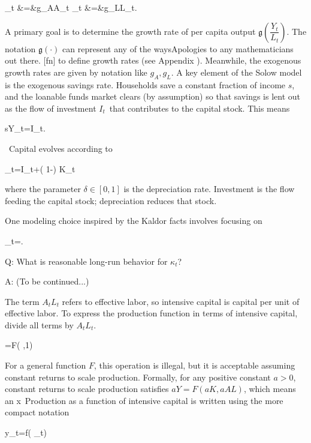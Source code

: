 ﻿\documentclass[oneside]{book}
\begin{document}
_{t} &=&g_{A}A_{t}
_{t} &=&g_{L}L_{t}.


A primary goal is to determine the growth rate of per capita output $\mathfrak{g}( \dfrac{Y_{t}}{L_{t}}) $. The notation $\mathfrak{g}( \cdot ) $ can represent any of the waysApologies to any mathematicians out there. [fn] to define growth
rates (see Appendix ). Meanwhile, the exogenous growth rates are given by notation like $g_{A},g_{L}$.
A key element of the Solow model is the exogenous savings rate. Households
save a constant fraction of income $s$, and the loanable funds market clears
(by assumption) so that savings is lent out as the flow of investment $I_{t}$\ that contributes to the capital stock. This means



sY_{t}=I_{t}.



\ Capital evolves according to



_{t}=I_{t}+( 1-\delta ) K_{t}\text{,}


where the parameter $\delta \in [ 0,1] $ is the depreciation rate.  Investment is the flow feeding the capital stock; depreciation reduces that stock.

One modeling choice inspired by the Kaldor facts involves focusing on



\kappa _{t}=.




Q: What is reasonable long-run behavior for $\kappa _{t}$?

A: (To be continued...)

The term $A_{t}L_{t}$ refers to effective labor, so intensive
capital is capital per unit of effective labor. To express the production function in terms of intensive capital, divide all terms by $A_{t}L_{t}$.



=F( ,1)


For a general function $F$, this operation is illegal, but it is acceptable assuming constant returns to scale production. Formally, for any positive constant $a>0$, constant returns to scale production satisfies $aY=F(
aK,aAL) $, which means an x\
Production as a function of intensive capital is written using the more
compact notation



y_{t}=f( \kappa _{t})
\end{document}
